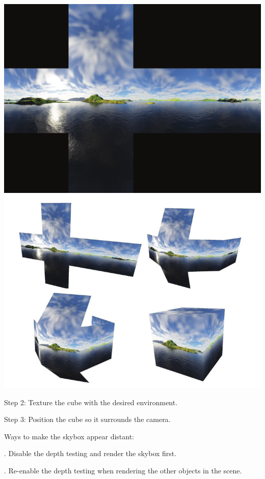 \documentclass[12pt]{article}
\begin{document}
\begin{enumerate}
	\begin{center}
	\includegraphics[scale = 0.3]{skybox/1.png}
	\includegraphics[scale = 0.3]{skybox/2.png}
	\end{center}	
	
	\qquad Step 2: Texture the cube with the desired environment.
	
	\qquad Step 3: Position the cube so it surrounds the camera.
	
	Ways to make the skybox appear distant:
	
	. Disable the depth testing and render the skybox first.

	. Re-enable the depth testing when rendering the other objects in the scene.


\end{enumerate}
\end{document}
